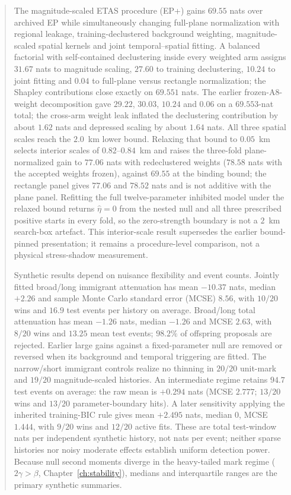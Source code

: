 \begin{abstract}
The magnitude-scaled ETAS procedure (EP+) gains $69.55$ nats over archived EP while simultaneously changing full-plane normalization with regional leakage, training-declustered background weighting, magnitude-scaled spatial kernels and joint temporal--spatial fitting. A balanced factorial with self-contained declustering inside every weighted arm assigns $31.67$ nats to magnitude scaling, $27.60$ to training declustering, $10.24$ to joint fitting and $0.04$ to full-plane versus rectangle normalization; the Shapley contributions close exactly on $69.551$ nats. The earlier frozen-A8-weight decomposition gave $29.22$, $30.03$, $10.24$ and $0.06$ on a $69.553$-nat total; the cross-arm weight leak inflated the declustering contribution by about $1.62$ nats and depressed scaling by about $1.64$ nats. All three spatial scales reach the $2.0$~km lower bound. Relaxing that bound to $0.05$~km selects interior scales of $0.82$--$0.84$~km and raises the three-fold plane-normalized gain to $77.06$ nats with redeclustered weights ($78.58$ nats with the accepted weights frozen), against $69.55$ at the binding bound; the rectangle panel gives $77.06$ and $78.52$ nats and is not additive with the plane panel. Refitting the full twelve-parameter inhibited model under the relaxed bound returns $\hat\eta=0$ from the nested null and all three prescribed positive starts in every fold, so the zero-strength boundary is not a $2$~km search-box artefact. This interior-scale result supersedes the earlier bound-pinned presentation; it remains a procedure-level comparison, not a physical stress-shadow measurement.

Synthetic results depend on nuisance flexibility and event counts. Jointly fitted broad/long immigrant attenuation has mean $-10.37$ nats, median $+2.26$ and sample Monte Carlo standard error (MCSE) $8.56$, with $10/20$ wins and $16.9$ test events per history on average. Broad/long total attenuation has mean $-1.26$ nats, median $-1.26$ and MCSE $2.63$, with $8/20$ wins and $13.25$ mean test events; $98.2\%$ of offspring proposals are rejected. Earlier large gains against a fixed-parameter null are removed or reversed when its background and temporal triggering are fitted. The narrow/short immigrant controls realize no thinning in $20/20$ unit-mark and $19/20$ magnitude-scaled histories. An intermediate regime retains $94.7$ test events on average: the raw mean is $+0.294$ nats (MCSE $2.777$; $13/20$ wins and $13/20$ parameter-boundary hits). A later sensitivity applying the inherited training-BIC rule gives mean $+2.495$ nats, median $0$, MCSE $1.444$, with $9/20$ wins and $12/20$ active fits. These are total test-window nats per independent synthetic history, not nats per event; neither sparse histories nor noisy moderate effects establish uniform detection power. Because null second moments diverge in the heavy-tailed mark regime ($2\gamma>\beta$, Chapter~\ref{ch:stability}), medians and interquartile ranges are the primary synthetic summaries.


\end{abstract}
